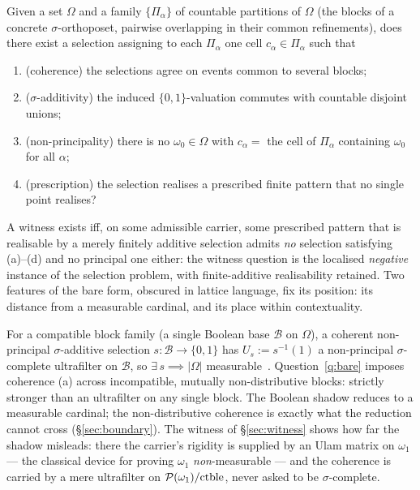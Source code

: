 \begin{question}\label{q:bare}
Given a set $\Omega$ and a family $\{\Pi_\alpha\}$ of countable partitions of
$\Omega$ (the blocks of a concrete $\sigma$-orthoposet, pairwise overlapping in
their common refinements), does there exist a selection assigning to each
$\Pi_\alpha$ one cell $c_\alpha\in\Pi_\alpha$ such that
\begin{enumerate}[label=\textup{(\alph*)}]
  \item (coherence) the selections agree on events common to several blocks;
  \item ($\sigma$-additivity) the induced $\{0,1\}$-valuation commutes with
    countable disjoint unions;
  \item (non-principality) there is no $\omega_0\in\Omega$ with $c_\alpha=$ the
    cell of $\Pi_\alpha$ containing $\omega_0$ for all $\alpha$;
  \item (prescription) the selection realises a prescribed finite pattern that no
    single point realises?
\end{enumerate}
A witness exists iff, on some admissible carrier, some prescribed pattern that is
realisable by a merely finitely additive selection admits \emph{no} selection
satisfying \textup{(a)}--\textup{(d)} and no principal one either: the witness
question is the localised \emph{negative} instance of the selection problem, with
finite-additive realisability retained. Two features of the bare form, obscured
in lattice language, fix its position: its distance from a measurable cardinal,
and its place within contextuality.
\end{question}

\begin{remark}\label{rem:not-measurable}
For a compatible block family (a single Boolean base $\mathcal B$ on $\Omega$), a
coherent non-principal $\sigma$-additive selection $s\colon\mathcal B\to\{0,1\}$
has $U_s := s^{-1}(1)$ a non-principal $\sigma$-complete ultrafilter on
$\mathcal B$, so $\exists\, s \implies |\Omega|$ measurable~\cite{Jech2003}.
Question~\ref{q:bare} imposes coherence (a) across incompatible, mutually
non-distributive blocks: strictly stronger than an ultrafilter on any single
block. The Boolean shadow reduces to a measurable cardinal; the non-distributive
coherence is exactly what the reduction cannot cross (\S\ref{sec:boundary}).
The witness of \S\ref{sec:witness} shows how far the shadow misleads: there the
carrier's rigidity is supplied by an Ulam matrix on $\omega_1$ --- the classical
device for proving $\omega_1$ \emph{non}-measurable --- and the coherence is
carried by a mere ultrafilter on $\mathcal{P}(\omega_1)/\mathrm{ctble}$, never asked to be
$\sigma$-complete.
\end{remark}

